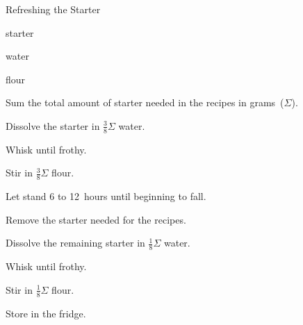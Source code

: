 \begin{recipe}{Refreshing the Starter}{}{}

\begin{ingredients}
\item starter
\item water
\item flour
\end{ingredients}

\begin{directions}
\item Sum the total amount of starter needed in the recipes in grams~($\Sigma$).
\item Dissolve the starter in $\frac{3}{8}\Sigma$ water.
\item Whisk until frothy. 
\item Stir in $\frac{3}{8}\Sigma$ flour.
\item Let stand 6 to 12~hours until beginning to fall.
\item Remove the starter needed for the recipes.
\item Dissolve the remaining starter in $\frac{1}{8}\Sigma$ water.
\item Whisk until frothy. 
\item Stir in $\frac{1}{8}\Sigma$ flour.
\item Store in the fridge.
\end{directions}

\end{recipe}
